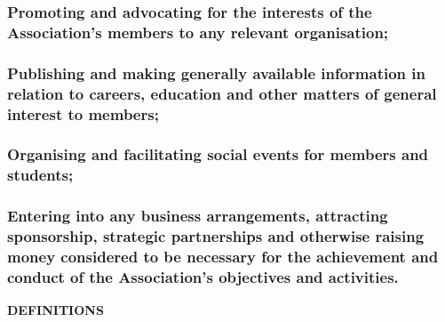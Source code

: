 \documentclass{article}
\newenvironment{subs}
  {\adjustwidth{2em}{0pt}}
  {\endadjustwidth}
\begin{document}
\begin{subs}
\begin{subs}
\subsubsection{Promoting and advocating for the interests of the Association's members to any relevant organisation;}
\subsubsection{Publishing and making generally available information in relation to careers, education and other matters of general interest to members;}
\subsubsection{Organising and facilitating social events for members and students;}
\subsubsection{Entering into any business arrangements, attracting sponsorship, strategic partnerships and otherwise raising money considered to be necessary for the achievement and conduct of the Association's objectives and activities.}
\end{subs}
\end{subs}

\vspace{5mm}
{\large\bf DEFINITIONS\par}
\hrulefill
\vspace{5mm}
\end{document}
